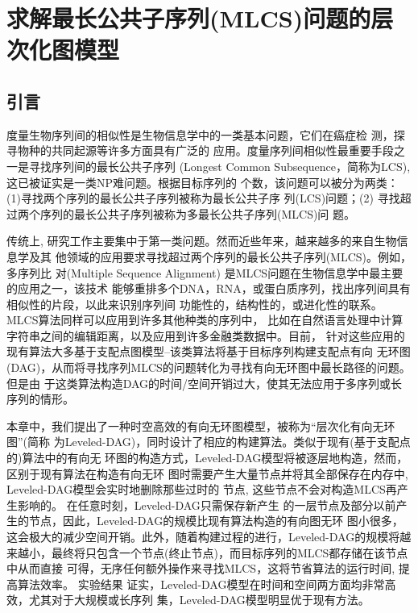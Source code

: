\documentclass[utf8]{frontiersSCNS} %
\begin{document}
\chapter{求解最长公共子序列(MLCS)问题的层次化图模型}


\section{引言}
\label{sec:introduction}

度量生物序列间的相似性是生物信息学中的一类基本问题，它们在癌症检
测\cite{Aravanis2017}，探寻物种的共同起源\cite{Zvelebil2007}等许多方面具有广泛的
应用。度量序列间相似性最重要手段之一是寻找序列间的最长公共子序列 (Longest Common
Subsequence，简称为LCS), 这已被证实是一类NP难问题\cite{Maier1978}。根据目标序列的
个数，该问题可以被分为两类：(1)寻找两个序列的最长公共子序列被称为最长公共子序
列(LCS)问题；(2) 寻找超过两个序列的最长公共子序列被称为多最长公共子序列(MLCS)问
题。

传统上, 研究工作主要集中于第一类问题。然而近些年来，越来越多的来自生物信息学及其
他领域的应用要求寻找超过两个序列的最长公共子序列(MLCS)。例如，多序列比
对(Multiple Sequence Alignment) 是MLCS问题在生物信息学中最主要的应用之一，该技术
能够重排多个DNA，RNA，或蛋白质序列，找出序列间具有相似性的片段，以此来识别序列间
功能性的，结构性的，或进化性的联系。 MLCS算法同样可以应用到许多其他种类的序列中，
比如在自然语言处理中计算字符串之间的编辑距离，以及应用到许多金融类数据中。目前，
针对这些应用的现有算法大多基于支配点图模型--该类算法将基于目标序列构建支配点有向
无环图(DAG)，从而将寻找序列MLCS的问题转化为寻找有向无环图中最长路径的问题。但是由
于这类算法构造DAG的时间/空间开销过大，使其无法应用于多序列或长序列的情形。

本章中，我们提出了一种时空高效的有向无环图模型，被称为“层次化有向无环图”(简称
为Leveled-DAG)，同时设计了相应的构建算法。类似于现有(基于支配点的)算法中的有向无
环图的构造方式，Leveled-DAG模型将被逐层地构造，然而，区别于现有算法在构造有向无环
图时需要产生大量节点并将其全部保存在内存中, Leveled-DAG模型会实时地删除那些过时的
节点, 这些节点不会对构造MLCS再产生影响的。 在任意时刻，Leveled-DAG只需保存新产生
的一层节点及部分以前产生的节点，因此，Leveled-DAG的规模比现有算法构造的有向图无环
图小很多，这会极大的减少空间开销。此外，随着构建过程的进行，Leveled-DAG的规模将越
来越小，最终将只包含一个节点(终止节点)，而目标序列的MLCS都存储在该节点中从而直接
可得，无序任何额外操作来寻找MLCS，这将节省算法的运行时间, 提高算法效率。 实验结果
证实，Leveled-DAG模型在时间和空间两方面均非常高效，尤其对于大规模或长序列
集，Leveled-DAG模型明显优于现有方法。
\end{document}
